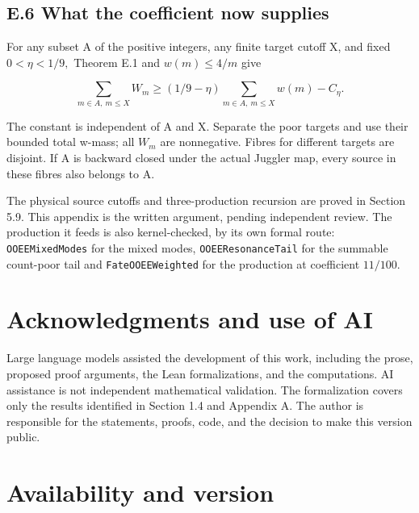 \documentclass[11pt,a4paper]{article}
\begin{document}
\subsection{E.6 What the coefficient now
supplies}\label{e.6-what-the-coefficient-now-supplies}

For any subset A of the positive integers, any finite target cutoff X,
and fixed \(0<\eta<1/9,\) Theorem E.1 and \(w(m)\le 4/m\) give

\[
 \sum_{m\in A,\ m\le X} W_m
    \ge (1/9-\eta)\sum_{m\in A,\ m\le X}w(m)-C_\eta.
 \tag{E.24}
\]

The constant is independent of A and X. Separate the poor targets and
use their bounded total w-mass; all \(W_m\) are nonnegative. Fibres for
different targets are disjoint. If A is backward closed under the actual
Juggler map, every source in these fibres also belongs to A.

The physical source cutoffs and three-production recursion are proved in
Section 5.9. This appendix is the written argument, pending independent
review. The production it feeds is also kernel-checked, by its own
formal route: \texttt{\nolinkurl{OOEEMixedModes}} for the mixed modes,
\texttt{\nolinkurl{OOEEResonanceTail}} for the summable count-poor tail
and \texttt{\nolinkurl{FateOOEEWeighted}} for the production at
coefficient \(11/100\).

\section{Acknowledgments and use of
AI}\label{acknowledgments-and-use-of-ai}

Large language models assisted the development of this work, including
the prose, proposed proof arguments, the Lean formalizations, and the
computations. AI assistance is not independent mathematical validation.
The formalization covers only the results identified in Section 1.4 and
Appendix A. The author is responsible for the statements, proofs, code,
and the decision to make this version public.

\section{Availability and version}\label{availability-and-version}
\end{document}
